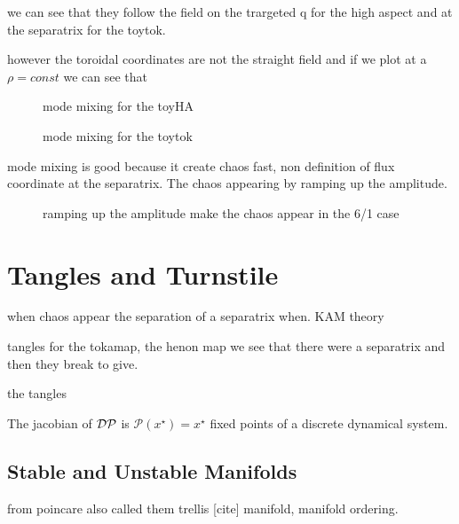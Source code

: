 we can see that they follow the field on the trargeted q for the high aspect and at the separatrix for the toytok. 

however the toroidal coordinates are not the straight field and if we plot at a $\rho = const$ we can see that
\begin{figure}[h!]
    \hfill
    \caption{mode mixing for the toyHA}
\end{figure}

\begin{figure}[h!]
    \hfill
    \caption{mode mixing for the toytok}
\end{figure}

mode mixing is good because it create chaos fast, non definition of flux coordinate at the separatrix. The chaos appearing by ramping up the amplitude.

\begin{figure}[h!]
    \hfill
    \caption{ramping up the amplitude make the chaos appear in the 6/1 case}
\end{figure}

\chapter{Tangles and Turnstile}

when chaos appear the separation of a separatrix when.
KAM theory

tangles for the tokamap, the henon map
we see that there were a separatrix and then they break to give.

the tangles

The jacobian of $\mathcal{D}\mathcal{P}$ is $\mathcal{P}(x^\star) = x^\star$ fixed points of a discrete dynamical system.

\section{Stable and Unstable Manifolds}

from poincare also called them trellis [cite]
manifold, manifold ordering.

